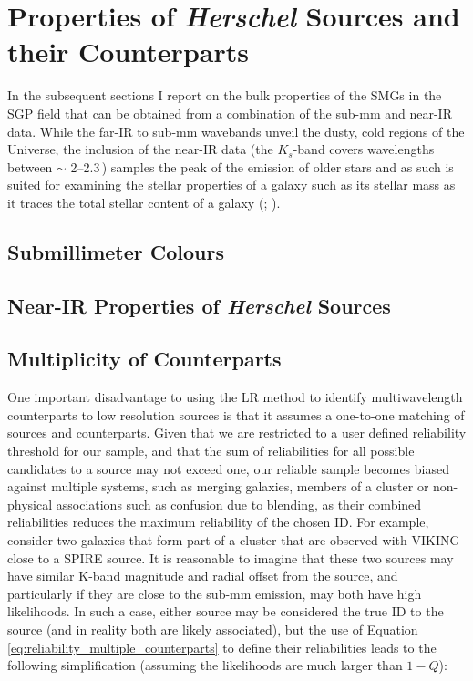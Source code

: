 \section{Properties of \textit{Herschel} Sources and their Counterparts}

In the subsequent sections I report on the bulk properties of the SMGs in the SGP field that can be obtained from a combination of the sub-mm and near-IR data. While the far-IR to sub-mm wavebands unveil the dusty, cold regions of the Universe, the inclusion of the near-IR data (the $K_s$-band covers wavelengths between $\sim$ 2--2.3\,\micron) samples the peak of the emission of older stars and as such is suited for examining the stellar properties of a galaxy such as its stellar mass as it traces the total stellar content of a galaxy (\citealt{Cole_2001}; \citealt{Bell_2003}).

\subsection{Submillimeter Colours}
\subsection{Near-IR Properties of \textit{Herschel} Sources}

\subsection{Multiplicity of Counterparts}
One important disadvantage to using the LR method to identify multiwavelength counterparts to low resolution sources is that it assumes a one-to-one matching of sources and counterparts. Given that we are restricted to a user defined reliability threshold for our sample, and that the sum of reliabilities for all possible candidates to a source may not exceed one, our reliable sample becomes biased against multiple systems, such as merging galaxies, members of a cluster or non-physical associations such as confusion due to blending, as their combined reliabilities reduces the maximum reliability of the chosen ID. For example, consider two galaxies that form part of a cluster that are observed with VIKING close to a SPIRE source. It is reasonable to imagine that these two sources may have similar K-band magnitude and radial offset from the source, and particularly if they are close to the sub-mm emission, may both have high likelihoods. In such a case, either source may be considered the true ID to the source (and in reality both are likely associated), but the use of Equation \ref{eq:reliability_multiple_counterparts} to define their reliabilities leads to the following simplification (assuming the likelihoods are much larger than $1-Q$):

